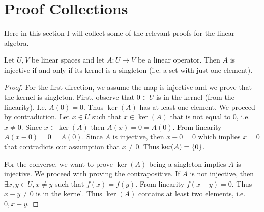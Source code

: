 \chapter{Proof Collections}


Here in this section I will collect some of the relevant proofs for the linear algebra.


\begin{thmbox}{}
	Let $ U,V $ be linear spaces and let $ A:U\to V $ be a linear operator. Then $ A $ is injective if and only if its kernel is a singleton (i.e. a set with just one element).
\end{thmbox}

\begin{proof}
	For the first direction, we assume the map is injective and we prove that the kernel is singleton. First, observe that $ 0 \in U $ is in the kernel (from the linearity). I.e. $ A(0) = 0 $. Thus $ \ker(A) $ has at least one element. We proceed by contradiction. Let $ x\in U $ such that $  x\in \ker(A) $ that is not equal to $ 0 $, i.e. $ x\neq 0 $. Since $ x\in \ker(A) $ then $ A(x) = 0 = A(0)$. From linearity $ A(x-0) = 0 = A(0) $. Since $ A $ is injective, then $ x-0 = 0 $ which implies $ x=0 $ that contradicts our assumption that $  x\neq 0 $. Thus $ \ker(A) = \set{0} $.
	
	\noindent For the converse, we want to prove $ \ker(A) $ being a singleton implies $ A $ is injective. We proceed with proving the contrapositive. If $ A $ is not injective, then $ \exists x,y \in U, x\neq y $ such that $ f(x) = f(y) $. From linearity $ f(x-y) = 0 $. Thus $ x-y \neq 0 $ is in the kernel. Thus $ \ker(A) $ contains at least two elements, i.e. $ 0, x-y $. 
\end{proof}
